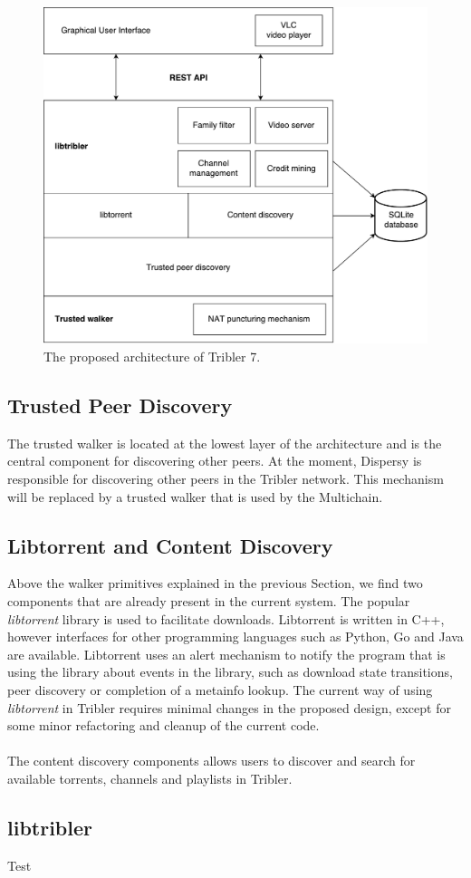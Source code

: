 \begin{figure}[h!]
	\centering
	\includegraphics[width=0.7\columnwidth]{images/architecture/tribler7}
	\caption{The proposed architecture of Tribler 7.}
	\label{fig:tribler7}
\end{figure}

\subsection{Trusted Peer Discovery}
The trusted walker is located at the lowest layer of the architecture and is the central component for discovering other peers. At the moment, Dispersy is responsible for discovering other peers in the Tribler network. This mechanism will be replaced by a trusted walker that is used by the Multichain.

\subsection{Libtorrent and Content Discovery}
Above the walker primitives explained in the previous Section, we find two components that are already present in the current system. The popular \emph{libtorrent} library is used to facilitate downloads. Libtorrent is written in C++, however interfaces for other programming languages such as Python, Go and Java are available. Libtorrent uses an alert mechanism to notify the program that is using the library about events in the library, such as download state transitions, peer discovery or completion of a metainfo lookup. The current way of using \emph{libtorrent} in Tribler requires minimal changes in the proposed design, except for some minor refactoring and cleanup of the current code.\\\\
The content discovery components allows users to discover and search for available torrents, channels and playlists in Tribler.

\subsection{libtribler}
Test


